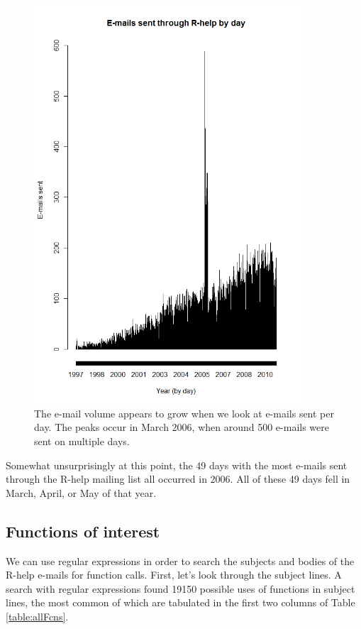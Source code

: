 \documentclass[12pt, a4paper, oneside]{amsart}
\begin{document}
\begin{figure}[htp]
\centering
\includegraphics[width = 100mm]{rhelpByDay.png}
\caption{The e-mail volume appears to grow when we look at e-mails sent per day.  The peaks occur in March 2006, when around 500 e-mails were sent on multiple days.}\label{fig:rhelpByDay}
\end{figure}

Somewhat unsurprisingly at this point, the 49 days with the most e-mails sent through the R-help mailing list all occurred in 2006.  All of these 49 days fell in March, April, or May of that year.  

\subsection{Functions of interest}

We can use regular expressions in order to search the subjects and bodies of the R-help e-mails for function calls.  First, let's look through the subject lines.  A search with regular expressions found 19150 possible uses of functions in subject lines, the most common of which are tabulated in the first two columns of Table \ref{table:allFcns}.
\end{document}
